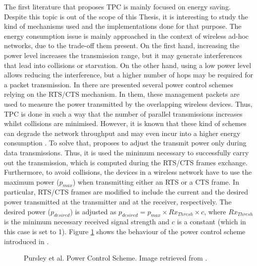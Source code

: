 \documentclass[12pt, a4paper,twoside]{tesi_upf}
\begin{document}
				The first literature that proposes TPC is mainly focused on energy saving. Despite this topic is out of the scope of this Thesis, it is interesting to study the kind of mechanisms used and the implementations done for that purpose. The energy consumption issue is mainly approached in the context of wireless ad-hoc networks, due to the trade-off them present. On the first hand, increasing the power level increases the transmission range, but it may generate interferences that lead into collisions or starvation. On the other hand, using a low power level allows reducing the interference, but a higher number of hops may be required for a packet transmission. In \cite{agarwal2001distributed, karn1990maca} there are presented several power control schemes relying on the RTS/CTS mechanism. In them, these management packets are used to measure the power transmitted by the overlapping wireless devices. Thus, TPC is done in such a way that the number of parallel transmissions increases whilst collisions are minimised. However, it is known that these kind of schemes can degrade the network throughput and may even incur into a higher energy consumption \cite{ebert1999combined}. To solve that, \cite{pursley2000energy} proposes to adjust the transmit power only during data transmissions. Thus, it is used the minimum necessary to successfully carry out the transmission, which is computed during the RTS/CTS frames exchange. Furthermore, to avoid collisions, the devices in a wireless network have to use the maximum power ($p_{max}$) when transmitting either an RTS or a CTS frame. In particular, RTS/CTS frames are modified to include the current and the desired power transmitted at the transmitter and at the receiver, respectively. The desired power ($p_{desired}$) is adjusted as $p_{desired} = p_{max} \times Rx_{Thresh} \times c$, where $Rx_{Thresh}$ is the minimum necessary received signal strength and $c$ is a constant (which in this case is set to 1). Figure \ref{fig:basic_tpc} shows the behaviour of the power control scheme introduced in \cite{pursley2000energy}.	
				\begin{figure}[h!]
					\centering
					\caption{Pursley et al. Power Control Scheme. Image retrieved from \cite{pursley2000energy}.}
					\label{fig:basic_tpc}
				\end{figure}		
					
\end{document}
